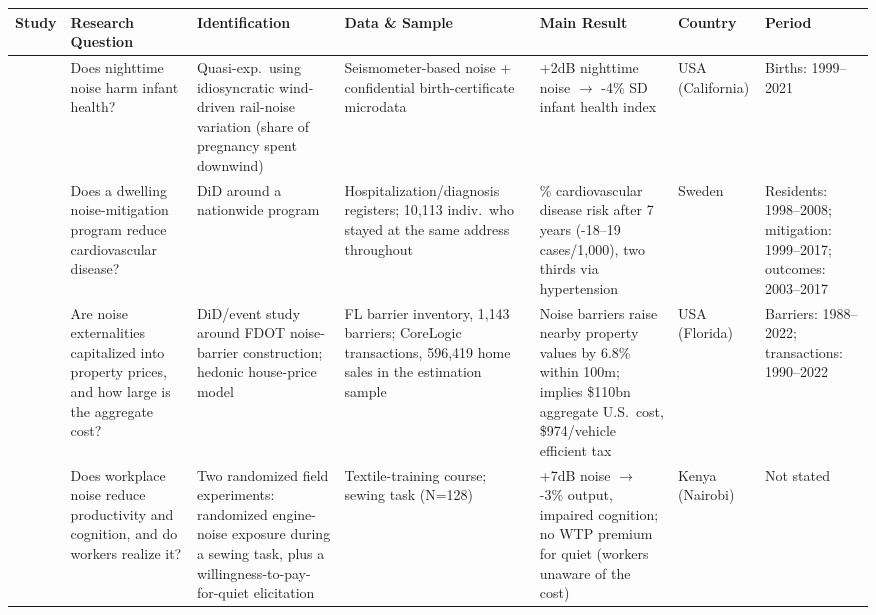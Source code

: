 \documentclass[11pt]{article}
\begin{document}
\begin{landscape}
\begin{lrbox}{\literaturepagebox}
\begin{minipage}{\linewidth}
\fontsize{8}{9.5}\selectfont
\renewcommand{\arraystretch}{1.1}
\setlength{\tabcolsep}{5pt}
\setlength{\aboverulesep}{0.5ex}
\setlength{\belowrulesep}{0.8ex}
\newlength{\literaturewidth}
\setlength{\literaturewidth}{\dimexpr\linewidth-12\tabcolsep\relax}
\noindent
\begin{tabular}{@{}
  >{\raggedright\arraybackslash}p{0.095\literaturewidth}
  >{\raggedright\arraybackslash}p{0.16\literaturewidth}
  >{\raggedright\arraybackslash}p{0.18\literaturewidth}
  >{\raggedright\arraybackslash}p{0.17\literaturewidth}
  >{\raggedright\arraybackslash}p{0.195\literaturewidth}
  >{\raggedright\arraybackslash}p{0.08\literaturewidth}
  >{\raggedright\arraybackslash}p{0.12\literaturewidth}@{}}
\toprule
\textbf{Study} & \textbf{Research Question} & \textbf{Identification} & \textbf{Data \& Sample} & \textbf{Main Result} & \textbf{Country} & \textbf{Period} \\
\midrule
\textcite{greenhillNoisePollutionInfant2026} & Does nighttime noise harm infant health? & Quasi-exp.\ using idiosyncratic wind-driven rail-noise variation (share of pregnancy spent downwind) & Seismometer-based noise + confidential birth-certificate microdata & +2dB nighttime noise $\rightarrow$ -4\% SD infant health index & USA (California) & Births: 1999--2021 \\
\addlinespace[0.7em]
\textcite{lindgrenSoundEnvironmentHealth2021} & Does a dwelling noise-mitigation program reduce cardiovascular disease? & DiD around a nationwide program & Hospitalization/diagnosis registers; 10{,}113 indiv.\ who stayed at the same address throughout & -10\% cardiovascular disease risk after 7 years (-18--19 cases/1{,}000), two thirds via hypertension & Sweden & Residents: 1998--2008; mitigation: 1999--2017; outcomes: 2003--2017 \\
\addlinespace[0.7em]
\textcite{morettiTrafficNoiseExternality2025} & Are noise externalities capitalized into property prices, and how large is the aggregate cost? & DiD/event study around FDOT noise-barrier construction; hedonic house-price model & FL barrier inventory, 1{,}143 barriers; CoreLogic transactions, 596{,}419 home sales in the estimation sample & Noise barriers raise nearby property values by 6.8\% within 100m; implies \$110bn aggregate U.S.\ cost, \$974/vehicle efficient tax & USA (Florida) & Barriers: 1988--2022; transactions: 1990--2022 \\
\addlinespace[0.7em]
\textcite{deanNoiseCognitiveFunction2024} & Does workplace noise reduce productivity and cognition, and do workers realize it? & Two randomized field experiments: randomized engine-noise exposure during a sewing task, plus a willingness-to-pay-for-quiet elicitation & Textile-training course; sewing task (N=128) & +7dB noise $\rightarrow$ -3\% output, impaired cognition; no WTP premium for quiet (workers unaware of the cost) & Kenya (Nairobi) & Not stated \\

\end{tabular}
\end{minipage}
\end{lrbox}
\end{landscape}
\end{document}
